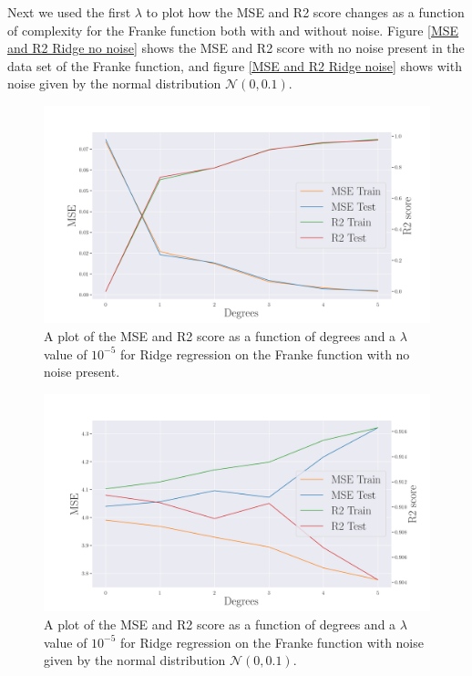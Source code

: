 \noindent Next we used the first $\lambda$ to plot how the MSE and R2 score changes as a function of complexity for the Franke function both with and without noise. Figure \eqref{MSE and R2 Ridge no noise} shows the MSE and R2 score with no noise present in the data set of the Franke function, and figure \eqref{MSE and R2 Ridge noise} shows with noise given by the normal distribution $\mathcal{N}(0,0.1)$.
\begin{figure}[H]
	\centering
	\includegraphics[width=\linewidth]{images/Figure_15.png}
	\caption{A plot of the MSE and R2 score as a function of degrees and a $\lambda$ value of $10^{-5}$ for Ridge regression on the Franke function with no noise present.}
	\label{MSE and R2 Ridge no noise}
\end{figure}
\begin{figure}[H]
	\centering
	\includegraphics[width=\linewidth]{images/Figure_16.png}
	\caption{A plot of the MSE and R2 score as a function of degrees and a $\lambda$ value of $10^{-5}$ for Ridge regression on the Franke function with noise given by the normal distribution $\mathcal{N}(0,0.1)$.}
	\label{MSE and R2 Ridge noise}
\end{figure}
